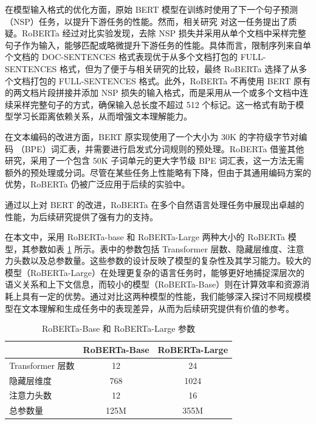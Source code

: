 在模型输入格式的优化方面，原始 BERT 模型在训练时使用了下一个句子预测（NSP）任务，以提升下游任务的性能。然而，相关研究 \cite{Lample2019CrosslingualLM, Yang2019XLNetGA, Joshi2019SpanBERTIP} 对这一任务提出了质疑。RoBERTa 经过对比实验发现，去除 NSP 损失并采用从单个文档中采样完整句子作为输入，能够匹配或略微提升下游任务的性能。具体而言，限制序列来自单个文档的 DOC-SENTENCES 格式表现优于从多个文档打包的 FULL-SENTENCES 格式，但为了便于与相关研究的比较，最终 RoBERTa 选择了从多个文档打包的 FULL-SENTENCES 格式。此外，RoBERTa 不再使用 BERT 原有的两文档片段拼接并添加 NSP 损失的输入格式，而是采用从一个或多个文档中连续采样完整句子的方式，确保输入总长度不超过 512 个标记。这一格式有助于模型学习长距离依赖关系，从而增强文本理解能力。

在文本编码的改进方面，BERT 原实现使用了一个大小为 30K 的字符级字节对编码 \cite{BPE}（BPE）词汇表，并需要进行启发式分词规则的预处理。RoBERTa 借鉴其他研究，采用了一个包含 50K 子词单元的更大字节级 BPE 词汇表，这一方法无需额外的预处理或分词。尽管在某些任务上性能略有下降，但由于其通用编码方案的优势，RoBERTa 仍被广泛应用于后续的实验中。

通过以上对 BERT 的改进，RoBERTa 在多个自然语言处理任务中展现出卓越的性能，为后续研究提供了强有力的支持。

在本文中，采用 RoBERTa-base 和 RoBERTa-Large 两种大小的 RoBERTa 模型，其参数如表 \ref{tab:roberta-parameter} 所示。表中的参数包括 Transformer 层数、隐藏层维度、注意力头数以及总参数量。这些参数的设计反映了模型的复杂性及其学习能力。较大的模型（RoBERTa-Large）在处理更复杂的语言任务时，能够更好地捕捉深层次的语义关系和上下文信息，而较小的模型（RoBERTa-Base）则在计算效率和资源消耗上具有一定的优势。通过对比这两种模型的性能，我们能够深入探讨不同规模模型在文本理解和生成任务中的表现差异，从而为后续研究提供有价值的参考。

\begin{table}[htbp]
\centering
\caption{ RoBERTa-Base 和 RoBERTa-Large 参数} \label{tab:roberta-parameter}
\begin{tabular}{lcc}
\toprule
               & \multicolumn{1}{l}{\textbf{RoBERTa-Base} \cite{liu_roberta_2019}} & \multicolumn{1}{l}{\textbf{RoBERTa-Large} \cite{liu_roberta_2019}} \\ \midrule
Transformer 层数 & 12                                        & 24                                         \\
隐藏层维度          & 768                                       & 1024                                       \\
注意力头数          & 12                                        & 16                                         \\
总参数量           & 125M                                      & 355M                                      \\ \bottomrule
\end{tabular}
\end{table}

